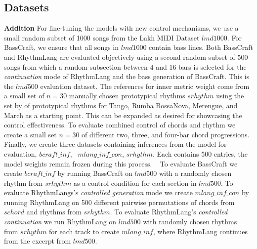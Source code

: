 \subsection{Datasets}
\textbf{Addition} For fine-tuning the models with new control mechanisms, we use a small random subset of 1000 songs from the Lakh MIDI Dataset $lmd1000$. For BassCraft, we ensure that all songs in $lmd1000$ contain bass lines. Both BassCraft and RhythmLang are evaluated objectively using a second random subset of 500 songs from which a random subsection between 4 and 16 bars is selected for the \textit{continuation} mode of RhythmLang and the bass generation of BassCraft. This is the $lmd500$ evaluation dataset. The references for inner metric weight come from a small set of $n=30$ manually chosen prototypical rhythms $srhythm$ using the set by \cite{Chew_Volk_Lee_Dance_metric_weight_2005} of prototypical rhythms for Tango, Rumba BossaNova, Merengue, and March as a starting point. This can be expanded as desired for showcasing the control effectiveness.
To evaluate combined control of chords and rhythm we create a small set $n=30$ of different two, three, and four-bar chord progressions.
Finally, we create three datasets containing inferences from the model for evaluation, $bcraft\_inf$,  $mlang\_inf\_con$, $srhythm$. Each contains 500 entries, the model weights remain frozen during this process.  
To evaluate BassCraft we create $bcraft\_inf$ by running BassCraft on $lmd500$ with a randomly chosen rhythm from $srhythm$ as a control condition for each section in $lmd500$. 
To evaluate RhythmLangs's \textit{controlled generation} mode we create $mlang\_inf\_con$ by running RhythmLang on 500 different pairwise permutations of chords from $schord$ and rhythms from $srhythm$. 
To evaluate RhythmLang's \textit{controlled continuation} we run RhythmLang on $lmd500$ with randomly chosen rhythms from $srhythm$ for each track to create $mlang\_inf$, where RhythmLang continues from the excerpt from $lmd500$.  


